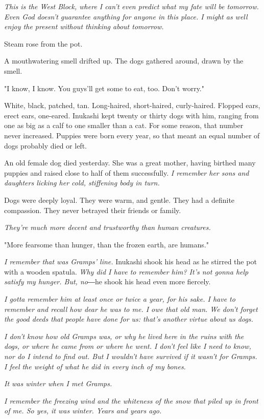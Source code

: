 \emph{This is the West Block, where I can't even predict what my fate will be
tomorrow. Even God doesn't guarantee anything for anyone in this place.
I might as well enjoy the present without thinking about tomorrow.}

Steam rose from the pot.

A mouthwatering smell drifted up. The dogs gathered around, drawn by the
smell.

"I know, I know. You guys'll get some to eat, too. Don't worry."

White, black, patched, tan. Long-haired, short-haired, curly-haired.
Flopped ears, erect ears, one-eared. Inukashi kept twenty or thirty dogs
with him, ranging from one as big as a calf to one smaller than a cat.
For some reason, that number never increased. Puppies were born every
year, so that meant an equal number of dogs probably died or left.

An old female dog died yesterday. She was a great mother, having birthed
many puppies and raised close to half of them successfully. \emph{I remember
her sons and daughters licking her cold, stiffening body in turn.}

Dogs were deeply loyal. They were warm, and gentle. They had a definite
compassion. They never betrayed their friends or family.

\emph{They're much more decent and trustworthy than human creatures.}

"More fearsome than hunger, than the frozen earth, are humans."

\emph{I remember that was Gramps' line.} Inukashi shook his head as he stirred
the pot with a wooden spatula. \emph{Why did I have to remember him? It's not
gonna help satisfy my hunger. But, no}―he shook his head even more
fiercely.

\emph{I gotta remember him at least once or twice a year, for his sake. I have
to remember and recall how dear he was to me. I owe that old man. We
don't forget the good deeds that people have done for us: that's another
virtue about us dogs.}

\emph{I don't know how old Gramps was, or why he lived here in the ruins with
the dogs, or where he came from or where he went. I don't feel like I
need to know, nor do I intend to find out. But I wouldn't have survived
if it wasn't for Gramps. I feel the weight of what he did in every inch
of my bones.}

\emph{It was winter when I met Gramps.}

\emph{I remember the freezing wind and the whiteness of the snow that piled up
in front of me. So yes, it was winter. Years and years ago.}

